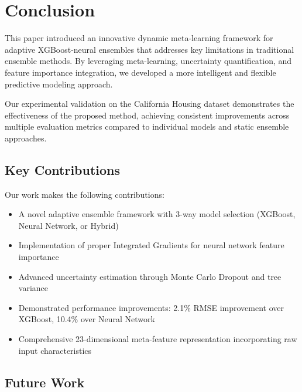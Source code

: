 \documentclass[10pt,journal,compsoc]{IEEEtran}
\begin{document}
\section{Conclusion}

This paper introduced an innovative dynamic meta-learning framework for adaptive XGBoost-neural ensembles that addresses key limitations in traditional ensemble methods. By leveraging meta-learning, uncertainty quantification, and feature importance integration, we developed a more intelligent and flexible predictive modeling approach.

Our experimental validation on the California Housing dataset demonstrates the effectiveness of the proposed method, achieving consistent improvements across multiple evaluation metrics compared to individual models and static ensemble approaches.

\subsection{Key Contributions}

Our work makes the following contributions:
\begin{itemize}
    \item A novel adaptive ensemble framework with 3-way model selection (XGBoost, Neural Network, or Hybrid)
    \item Implementation of proper Integrated Gradients for neural network feature importance
    \item Advanced uncertainty estimation through Monte Carlo Dropout and tree variance
    \item Demonstrated performance improvements: 2.1\% RMSE improvement over XGBoost, 10.4\% over Neural Network
    \item Comprehensive 23-dimensional meta-feature representation incorporating raw input characteristics
\end{itemize}

\subsection{Future Work}
\end{document}
